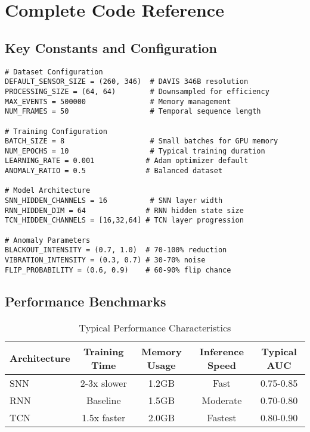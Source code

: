 \documentclass[12pt,a4paper]{article}
\begin{document}
\appendix

\section{Complete Code Reference}

\subsection{Key Constants and Configuration}

\begin{lstlisting}[caption={Important Configuration Values}]
# Dataset Configuration
DEFAULT_SENSOR_SIZE = (260, 346)  # DAVIS 346B resolution
PROCESSING_SIZE = (64, 64)        # Downsampled for efficiency
MAX_EVENTS = 500000               # Memory management
NUM_FRAMES = 50                   # Temporal sequence length

# Training Configuration
BATCH_SIZE = 8                    # Small batches for GPU memory
NUM_EPOCHS = 10                   # Typical training duration
LEARNING_RATE = 0.001            # Adam optimizer default
ANOMALY_RATIO = 0.5              # Balanced dataset

# Model Architecture
SNN_HIDDEN_CHANNELS = 16          # SNN layer width
RNN_HIDDEN_DIM = 64              # RNN hidden state size
TCN_HIDDEN_CHANNELS = [16,32,64] # TCN layer progression

# Anomaly Parameters
BLACKOUT_INTENSITY = (0.7, 1.0)  # 70-100% reduction
VIBRATION_INTENSITY = (0.3, 0.7) # 30-70% noise
FLIP_PROBABILITY = (0.6, 0.9)    # 60-90% flip chance
\end{lstlisting}

\subsection{Performance Benchmarks}

\begin{table}[H]
\centering
\begin{tabular}{|l|c|c|c|c|}
\hline
\textbf{Architecture} & \textbf{Training Time} & \textbf{Memory Usage} & \textbf{Inference Speed} & \textbf{Typical AUC} \\
\hline
SNN & 2-3x slower & 1.2GB & Fast & 0.75-0.85 \\
RNN & Baseline & 1.5GB & Moderate & 0.70-0.80 \\
TCN & 1.5x faster & 2.0GB & Fastest & 0.80-0.90 \\
\hline
\end{tabular}
\caption{Typical Performance Characteristics}
\end{table}
\end{document}
